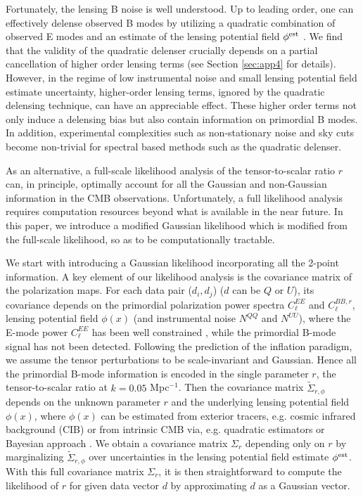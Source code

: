 \documentclass[iop,apj, numberedappendix]{emulateapj}
\begin{document}
Fortunately,  the lensing B noise is well understood.
Up to leading order, one can effectively delense observed B modes by utilizing
a quadratic combination of observed E modes and an estimate of the lensing potential field $\phi^{\rm est}$
\citep{Knox2002, Kesden2002, Seljak2003a, Simard2015a, Sherwin2015}.
We find that the validity of the quadratic delenser crucially depends on a partial cancellation of
higher order lensing terms (see Section \ref{sec:app4} for details).
However, in the regime of low instrumental noise and small lensing potential field estimate uncertainty,
higher-order lensing terms, ignored by the quadratic delensing technique,
can have an appreciable effect. These higher order terms not only induce
a delensing bias but also contain information on primordial B modes.
In addition, experimental complexities such as non-stationary noise and sky cuts
become non-trivial for spectral based methods such as the quadratic delenser.

As an alternative, a full-scale likelihood analysis of the tensor-to-scalar ratio $r$ can,
in principle, optimally account for all the Gaussian and non-Gaussian information in the CMB observations.
Unfortunately, a full likelihood analysis requires computation resources beyond
what is available in the near future.
In this paper, we introduce a modified Gaussian likelihood which is modified from the full-scale
likelihood, so as to be computationally tractable.

We start with introducing a Gaussian likelihood incorporating all the 2-point information.
A key element of our likelihood analysis is the covariance matrix of the polarization maps.
For each data pair ($d_i, d_j$) ($d$ can be $Q$ or $U$),  its covariance
depends on the primordial polarization power spectra $C_\ell^{EE}$ and $C_\ell^{BB,r}$,
lensing potential field $\phi(x)$ (and instrumental noise $N^{QQ}$ and $N^{UU}$),
where the E-mode power $C_\ell^{EE}$ has been well constrained
\citep[e.g.][]{PlanckCollaborationXI2015, PlanckCollaborationXIII2015},
while the primordial B-mode signal has not been detected.
Following the prediction of the inflation paradigm,
we assume the tensor perturbations to be scale-invariant and Gaussian.
Hence all the primordial B-mode  information is encoded in the single parameter $r$, the
tensor-to-scalar ratio at $k=0.05$ Mpc$^{-1}$.
Then the covariance matrix $\tilde \Sigma_{r,\phi}$
depends on the unknown parameter $r$ and the underlying lensing potential field $\phi(x)$,
where $\phi(x)$ can be estimated from exterior tracers, e.g. cosmic infrared background (CIB)
\citep{Song2003, Dole2006, PlanckCollaborationXVII2014, PlanckCollaboration2015a, Larsen2016, Manzotti2017} or
from intrinsic CMB via, e.g. quadratic estimators \citep{Hu2001, Hu2002b}
or Bayesian approach \citep{Hirata2003a, Hirata2003,Anderes2011, Anderes2015, Millea2017}.
We obtain a covariance matrix $\Sigma_r$ depending only on $r$ by marginalizing $\tilde \Sigma_{r,\phi}$
over uncertainties in the lensing potential field estimate $\phi^{\rm est}$.
With this full covariance matrix $\Sigma_r$, it is then straightforward to compute the likelihood of $r$
for given data vector $d$ by approximating $d$ as a Gaussian vector.
\end{document}
